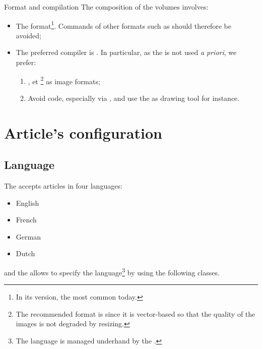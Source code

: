 \documentclass[english,nolocaltoc]{nwejmart}
\newtheorem[style=definition]{fact}
\newtheorem[title=experience]{experience}
\newtheorem[title-plural=rings]{ring}
\newtheorem[title=ideal,title-plural=ideals]{ideal}
\begin{document}
\begin{dbwarning}{Format and  compilation}{}
  The composition of the \nwejm*{} volumes involves:
  \begin{itemize}
  \item The  format\footnote{In its  version, the most
      common today.}. Commands of other formats such as  should therefore be avoided;
  \item The preferred compiler is . In particular, as the  is not used \emph{a priori}, we prefer:
    \begin{enumerate}
    \item {},  et
      \footnote{The recommended format is  since it is vector-based so that the quality of the images is not degraded by resizing.} as image formats;
    \item Avoid  code, especially via
      , and use the  as drawing tool
      for instance.
    \end{enumerate}
  \end{itemize}
\end{dbwarning}

\section{Article's configuration}

\subsection{Language}
\label{sec:langue-de-larticle}

The \nwejm{} accepts articles in four languages:
\begin{itemize}
\item English
\item French
\item German
\item Dutch
\end{itemize}
and the \nwejmauthorcl{} allows to specify the language\footnote{The language is managed underhand by the .} by using the following classes.
\end{document}
